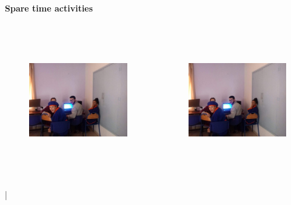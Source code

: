 \documentclass[11pt,aspectratio=169]{beamer}
\begin{document}
\begin{frame}{\underline{\secname}}
	
	\begin{center}
		\textbf{Spare time activities}
	\end{center}
	\begin{columns}
		\begin{column}{0.5\linewidth}
	
      \begin{figure}
	\centering
	\includegraphics[width=1.2\linewidth,height=170pt]{figures/IMG-20190510-WA0014.jpg}
\end{figure}
			\end{column}
		
		\begin{column}{0.5\linewidth}
 
       \begin{figure}
	\centering
	\includegraphics[width=1.2\linewidth,height=170pt]{figures/IMG-20190510-WA0014.jpg}
\end{figure}
			\end{column}
	\end{columns}
	
|
\end{frame}
\end{document}
